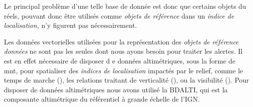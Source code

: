 Le principal problème d'une telle base de donnée est donc que certains
objets du réels, pouvant donc être utilisés comme \emph{objets de
  référence} dans un \emph{indice de localisation,} n'y figurent pas
nécessairement.

Les données vectorielles utilisées pour la représentation des
\emph{objets de référence données} ne sont pas les seules dont nous
ayons besoin pour traiter les alertes. Il est en effet nécessaire de
disposer d e données altimétriques, sous la forme de \ac{mnt}, pour
spatialiser des \emph{indices de localisation} impactés par le relief,
comme le temps de marche (), les
relations traitant de verticalité (\eg {}), ou
la visibilité (). Pour disposer de
données altimétriques nous avons utilisé la BDALTI, qui est la
composante altimétrique du référentiel à grande échelle de l'IGN.


